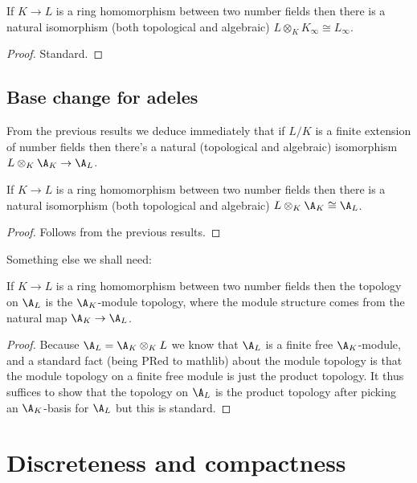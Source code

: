 \begin{theorem}
  \label{NumberField.InfiniteAdeleRing.baseChangeEquiv}
  If $K\to L$ is a ring homomorphism between two number fields then there is a natural isomorphism
  (both topological and algebraic) $L\otimes_KK_\infty\cong L_\infty$.
\end{theorem}
\begin{proof}
  Standard.
\end{proof}

\subsection{Base change for adeles}

From the previous results we deduce immediately that if $L/K$ is a finite extension
of number fields then there's a natural (topological and algebraic) isomorphism
$L\otimes_K\A_K\to \A_L$.

\begin{theorem}
  \label{NumberField.AdeleRing.baseChangeEquiv}
  If $K\to L$ is a ring homomorphism between two number fields then there is a natural isomorphism
  (both topological and algebraic) $L\otimes_K\A_K\cong\A_L$.
\end{theorem}
\begin{proof}
  Follows from the previous results.
\end{proof}

Something else we shall need:

\begin{theorem}
  \label{NumberField.AdeleRing.baseChange_moduleTopology}
  If $K\to L$ is a ring homomorphism between two number fields then the topology on $\A_L$
  is the $\A_K$-module topology, where the module structure comes from the
  natural map $\A_K\to\A_L$.
\end{theorem}
\begin{proof}
  Because $\A_L=\A_K\otimes_{K}L$ we know that $\A_L$ is a finite free $\A_K$-module,
  and a standard fact (being PRed to mathlib) about the module topology is that the module topology
  on a finite free module is just the product topology. It thus suffices to show that
  the topology on $\A_L$ is the product topology after picking an $\A_K$-basis for $\A_L$
  but this is standard.
\end{proof}

\section{Discreteness and compactness}

